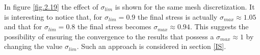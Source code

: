 In figure \ref{fig.2.19} the effect of $\sigma_{lim}$ is shown for the same mesh discretization. It is interesting to notice that, for $\sigma_{lim}=0.9$ the final stress is actually $\sigma_{max}\approx1.05$ and that for $\sigma_{lim}=0.8$ the final stress becomes $\sigma_{max}\approx0.94$. This suggests the possibility of ensuring the convergence to the results that possess a $\sigma_{max}\approx 1$ by changing the value $\sigma_{lim}$. Such an approach is considered in section \ref{IS}.
\begin{figure}[h!]
\centering
{}%
\quad
{}%
 \\
 \quad

\end{figure}
